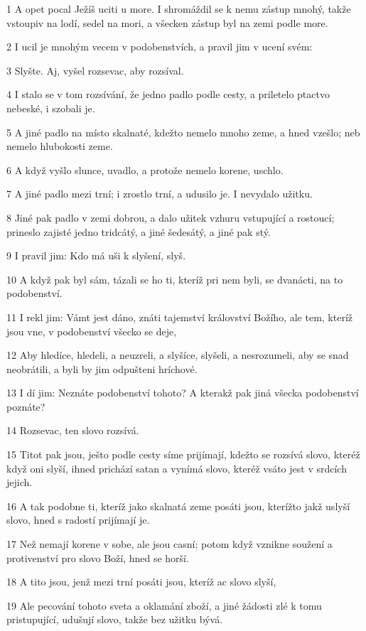 \par 1 A opet pocal Ježíš uciti u more. I shromáždil se k nemu zástup mnohý, takže vstoupiv na lodí, sedel na mori, a všecken zástup byl na zemi podle more.
\par 2 I ucil je mnohým vecem v podobenstvích, a pravil jim v ucení svém:
\par 3 Slyšte. Aj, vyšel rozsevac, aby rozsíval.
\par 4 I stalo se v tom rozsívání, že jedno padlo podle cesty, a priletelo ptactvo nebeské, i szobali je.
\par 5 A jiné padlo na místo skalnaté, kdežto nemelo mnoho zeme, a hned vzešlo; neb nemelo hlubokosti zeme.
\par 6 A když vyšlo slunce, uvadlo, a protože nemelo korene, uschlo.
\par 7 A jiné padlo mezi trní; i zrostlo trní, a udusilo je. I nevydalo užitku.
\par 8 Jiné pak padlo v zemi dobrou, a dalo užitek vzhuru vstupující a rostoucí; prineslo zajisté jedno tridcátý, a jiné šedesátý, a jiné pak stý.
\par 9 I pravil jim: Kdo má uši k slyšení, slyš.
\par 10 A když pak byl sám, tázali se ho ti, kteríž pri nem byli, se dvanácti, na to podobenství.
\par 11 I rekl jim: Vámt jest dáno, znáti tajemství království Božího, ale tem, kteríž jsou vne, v podobenství všecko se deje,
\par 12 Aby hledíce, hledeli, a neuzreli, a slyšíce, slyšeli, a nesrozumeli, aby se snad neobrátili, a byli by jim odpušteni hríchové.
\par 13 I dí jim: Neznáte podobenství tohoto? A kterakž pak jiná všecka podobenství poznáte?
\par 14 Rozsevac, ten slovo rozsívá.
\par 15 Titot pak jsou, ješto podle cesty síme prijímají, kdežto se rozsívá slovo, kteréž když oni slyší, ihned prichází satan a vynímá slovo, kteréž vsáto jest v srdcích jejich.
\par 16 A tak podobne ti, kteríž jako skalnatá zeme posáti jsou, kterížto jakž uslyší slovo, hned s radostí prijímají je.
\par 17 Než nemají korene v sobe, ale jsou casní; potom když vznikne soužení a protivenství pro slovo Boží, hned se horší.
\par 18 A tito jsou, jenž mezi trní posáti jsou, kteríž ac slovo slyší,
\par 19 Ale pecování tohoto sveta a oklamání zboží, a jiné žádosti zlé k tomu pristupující, udušují slovo, takže bez užitku bývá.
